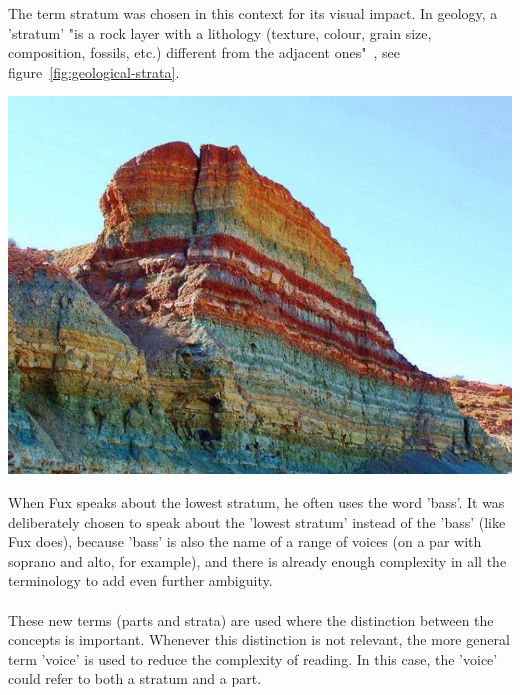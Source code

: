 \begin{minipage}{0.6\textwidth}
    The term stratum was chosen in this context for its visual impact. In geology, a 'stratum' "is a rock layer with a lithology (texture, colour, grain size, composition, fossils, etc.) different from the adjacent ones"~\cite{mcnair2023}, see figure~\ref{fig:geological-strata}.
    \end{minipage}
    \hfill
    \begin{minipage}{0.3\textwidth}
      \centering
      \includegraphics[width=\textwidth]{Images/rainbow-sediment.jpg}
      \label{fig:geological-strata}
\end{minipage}
\vspace{.5cm}

When Fux speaks about the lowest stratum, he often uses the word 'bass'. It was deliberately chosen to speak about the 'lowest stratum' instead of the 'bass' (like Fux does), because 'bass' is also the name of a range of voices (on a par with soprano and alto, for example), and there is already enough complexity in all the terminology to add even further ambiguity. 

\paragraph{}
These new terms (parts and strata) are used where the distinction between the concepts is important. Whenever this distinction is not relevant, the more general term 'voice' is used to reduce the complexity of reading. In this case, the 'voice' could refer to both a stratum and a part.

